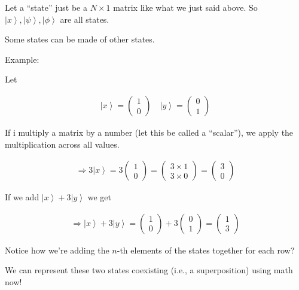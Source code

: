 \documentclass[
]{article}
\providecommand{\ket}[1]{\left\lvert #1 \right\rangle}
\providecommand{\Rarr}{\Rightarrow}
\begin{document}
Let a ``state'' just be a \(N\times 1\) matrix like what we just said
above. So \(\ket{x},\ket{\psi},\ket{\phi}\) are all states.

Some states can be made of other states.

Example:

Let

\begin{gather*}
	\ket{x}=\begin{pmatrix}
		1 \\
		0
	\end{pmatrix}\quad
	\ket{y}=\begin{pmatrix}
		0 \\
		1
	\end{pmatrix}
\end{gather*}


If i multiply a matrix by a number (let this be called a ``scalar''), we
apply the multiplication across all values.

\begin{gather*}
	\Rarr 3\ket{x}=3\begin{pmatrix}1\\0\end{pmatrix}=\begin{pmatrix}3\times1\\3\times0\end{pmatrix}=\begin{pmatrix}3\\ 0\end{pmatrix}
\end{gather*}


If we add \(\ket{x}+3\ket{y}\) we get

\begin{gather*}
	\Rarr\ket{x}+3\ket{y}=\begin{pmatrix}
		1 \\
		0
	\end{pmatrix}+3
	\begin{pmatrix}
		0 \\
		1
	\end{pmatrix}
	=\begin{pmatrix}
		1 \\
		3
	\end{pmatrix}
\end{gather*}


Notice how we're adding the \(n\)-th elements of the states together for
each row?

We can represent these two states coexisting (i.e., a superposition)
using math now!
\end{document}
